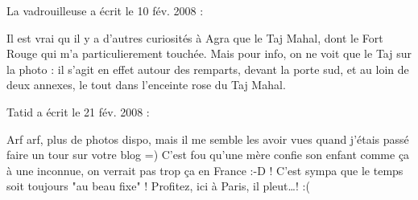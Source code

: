 \medskip
La vadrouilleuse a écrit le 10 fév. 2008 :
\begin{displayquote}
Il est vrai qu il y a d'autres curiosités à Agra que le Taj Mahal, dont le Fort Rouge qui m'a particulierement touchée. Mais pour info, on ne voit que le Taj sur la photo : il s'agit en effet autour des remparts, devant la porte sud, et au loin de deux annexes, le tout dans l'enceinte rose du Taj Mahal.
\end{displayquote}

\medskip
Tatid a écrit le 21 fév. 2008 :
\begin{displayquote}
Arf arf, plus de photos dispo, mais il me semble les avoir vues quand j'étais passé faire un tour sur votre blog =)
C'est fou qu'une mère confie son enfant comme ça à une inconnue, on verrait pas trop ça en France :-D ! C'est sympa que le temps soit toujours "au beau fixe" ! Profitez, ici à Paris, il pleut\dots ! :(
\end{displayquote}

\vfill
